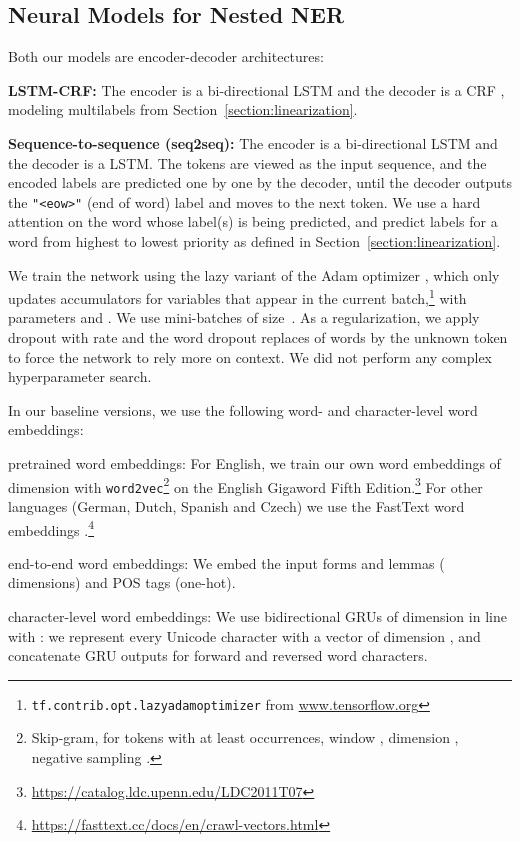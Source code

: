 \documentclass[11pt,a4paper]{article}
\newenvironment{citemize}{\begin{list}{}{\topsep=.5\smallskipamount\itemsep=0pt\parsep=1pt\labelwidth=.5em}}{\end{list}}
\begin{document}
\subsection{Neural Models for Nested NER}

Both our models are encoder-decoder architectures:

\textbf{LSTM-CRF:} The encoder is a bi-directional LSTM and the decoder is a CRF \cite{Lample2016},
modeling multilabels from Section~\ref{section:linearization}.

\textbf{Sequence-to-sequence (seq2seq):} The encoder is a bi-directional LSTM
and the decoder is a LSTM. The tokens are viewed as the input sequence, and the
encoded labels are predicted one by one by the decoder, until the decoder
outputs the \texttt{"<eow>"} (end of word) label and moves to the next token. We use
a hard attention on the word whose label(s) is being predicted, and predict labels for a word from highest to lowest priority as defined in Section~\ref{section:linearization}.

We train the network using the lazy variant of the Adam optimizer \cite{Adam}, which only updates accumulators for variables that appear in the current
batch,\footnote{\texttt{tf.contrib.opt.lazyadamoptimizer} from
\url{www.tensorflow.org}} with parameters  and . We
use mini-batches of size~. As a regularization, we apply dropout with rate
 and the word dropout replaces  of words by the unknown token to
force the network to rely more on context. We did not perform any complex
hyperparameter search.

In our baseline versions, we use the following word- and character-level word
embeddings:

\begin{citemize}
  \item pretrained word embeddings: For English, we train our own word
    embeddings of dimension  with \texttt{word2vec}\footnote{Skip-gram,
    for tokens with at least  occurrences, window , dimension ,
    negative sampling .} on the English Gigaword Fifth
    Edition.\footnote{\url{https://catalog.ldc.upenn.edu/LDC2011T07}} For other
    languages (German, Dutch, Spanish and Czech) we use the FastText word
    embeddings \cite{FastText}.\footnote{\url{https://fasttext.cc/docs/en/crawl-vectors.html}}
  \item end-to-end word embeddings: We embed the input forms and lemmas ( dimensions) and POS tags (one-hot).
  \item character-level word embeddings: We use bidirectional GRUs
    \cite{Cho2014,Graves2005} of dimension  in line with \citet{Ling2015}: we represent every
    Unicode character with a vector of dimension , and concatenate
    GRU outputs for forward and reversed word characters.
\end{citemize}
\end{document}
